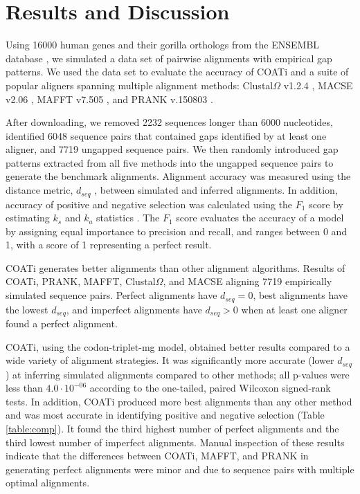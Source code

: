 \section*{Results and Discussion}
Using 16000 human genes and their gorilla orthologs from the ENSEMBL
database , we simulated a data set of pairwise
alignments with empirical gap patterns.
We used the data set to evaluate the accuracy of COATi and a suite of popular aligners spanning multiple alignment methods:
Clustal$\Omega$ v1.2.4 ,
MACSE v2.06 , MAFFT v7.505
, and PRANK v.150803 .

After downloading, we removed 2232 sequences longer than 6000 nucleotides, identified 6048 sequence pairs that contained gaps identified by at least one aligner, and 7719 ungapped sequence pairs.
We then randomly introduced gap patterns extracted from all five methods into the ungapped sequence pairs to generate the benchmark alignments.
Alignment accuracy was measured using the distance metric, $d_{seq}$
, between simulated and inferred
alignments.
In addition, accuracy of positive and negative selection was calculated
using the $F_1$ score by estimating $k_s$ and $k_a$ statistics
 .
The $F_1$ score evaluates the accuracy of a model by assigning equal importance to precision and recall, and ranges between 0 and 1, with a score of 1 representing a perfect result.

\begin{table}[!ht]
\centering

 \caption{COATi generates better alignments than other alignment algorithms. Results of COATi, PRANK, MAFFT, Clustal$\Omega$, and MACSE aligning 7719 empirically simulated sequence pairs. Perfect alignments have $d_{seq}=0$, best alignments have the lowest $d_{seq}$, and imperfect alignments have $d_{seq}>0$ when at least one aligner found a perfect alignment.}
 \label{table:comp}
\end{table}

COATi, using the codon-triplet-mg model, obtained better results compared to a wide variety of alignment strategies.
It was significantly more accurate (lower $d_{seq}$) at inferring simulated alignments compared to other methods; all p-values were less than $4.0 \cdot 10^{-06}$ according to the one-tailed, paired Wilcoxon signed-rank tests. 
%
In addition, COATi produced more best alignments than any other method and was most accurate in identifying positive and negative selection (Table \ref{table:comp}). It found the third highest number of perfect alignments and the third lowest number of imperfect alignments. Manual inspection of these results indicate that the differences between COATi, MAFFT, and PRANK in generating perfect alignments were minor and due to sequence pairs with multiple optimal alignments.


